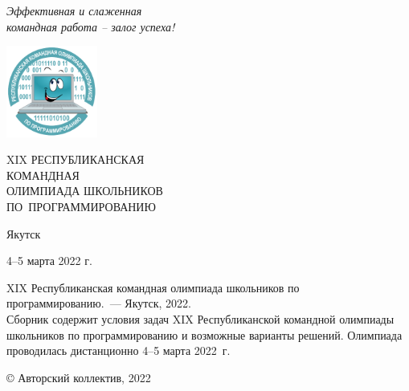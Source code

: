 \documentclass[a5paper, twoside, 11pt]{article}
\begin{document}
\pagestyle{empty}

\begin{flushright}
\it
Эффективная и слаженная\\
командная работа -- залог успеха!
\end{flushright}
{}\vskip-15mm

\includegraphics[width=3cm, height=3cm]{logo.pdf}
\\[3cm]

\begin{center}
\huge
XIX РЕСПУБЛИКАНСКАЯ \\КОМАНДНАЯ\\ОЛИМПИАДА ШКОЛЬНИКОВ \\
ПО~ПРОГРАММИРОВАНИЮ
\end{center}

\vfill
\centerline{Якутск}
\centerline{4--5 марта 2022 г.}
\newpage
\noindent XIX Республиканская командная олимпиада школьников по программированию.~--- Якутск, 2022.
\\[5mm]
Сборник содержит условия задач XIX Республиканской командной олимпиады школьников по программированию и возможные варианты решений. Олимпиада проводилась дистанционно 
4--5 марта 2022~г.
\vfill

{}\hfill © Авторский коллектив, 2022
\end{document}
